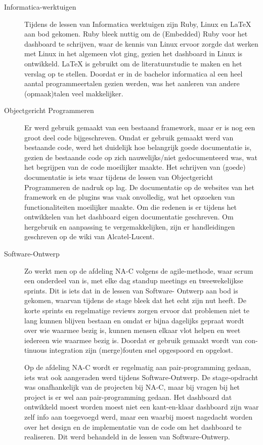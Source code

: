 \documentclass[10pt,a4paper]{article}
\begin{document}
\begin{description}
\item[Informatica-werktuigen]
Tijdens de lessen van Informatica werktuigen zijn Ruby, Linux en LaTeX aan
bod gekomen. Ruby bleek nuttig om de (Embedded) Ruby voor het dashboard
te schrijven, waar de kennis van Linux ervoor zorgde dat werken met Linux in
het algemeen vlot ging, gezien het dashboard in Linux is ontwikkeld. LaTeX is
gebruikt om de literatuurstudie te maken en het verslag op te stellen.
Doordat er in de bachelor informatica al een heel aantal programmeertalen
gezien werden, was het aanleren van andere (opmaak)talen veel makkelijker.

\item[Objectgericht Programmeren]
Er werd gebruik gemaakt van een bestaand framework, maar er is nog een groot
deel code bijgeschreven. Omdat er gebruik gemaakt werd van bestaande code,
werd het duidelijk hoe belangrijk goede documentatie is, gezien de bestaande
code op zich nauwelijks/niet gedocumenteerd was, wat het begrijpen van de
code moeilijker maakte. Het schrijven van (goede) documentatie is iets waar
tijdens de lessen van Objectgericht Programmeren de nadruk op lag. De documentatie
op de websites van het framework en de plugins was vaak onvolledig,
wat het opzoeken van functionaliteiten moeilijker maakte. Om die redenen is er
tijdens het ontwikkelen van het dashboard eigen documentatie geschreven. Om
hergebruik en aanpassing te vergemakkelijken, zijn er handleidingen geschreven
op de wiki van Alcatel-Lucent.

\item[Software-Ontwerp]
Zo werkt men op de afdeling NA-C volgens
de agile-methode, waar scrum een onderdeel van is, met elke dag standup
meetings en tweewekelijkse sprints. Dit is iets dat in de lessen van Software-
Ontwerp aan bod is gekomen, waarvan tijdens de stage bleek dat het echt zijn
nut heeft. De korte sprints en regelmatige reviews zorgen ervoor dat problemen
niet te lang kunnen blijven bestaan en omdat er bijna dagelijks gepraat
wordt over wie waarmee bezig is, kunnen mensen elkaar vlot helpen en weet
iedereen wie waarmee bezig is. Doordat er gebruik gemaakt wordt van con-
tinuous integration zijn (merge)fouten snel opgespoord en opgelost.

Op de afdeling NA-C wordt er
regelmatig aan pair-programming gedaan, iets wat ook aangeraden werd tijdens
Software-Ontwerp. De stage-opdracht was onafhankelijk van de projecten bij
NA-C, maar bij vragen bij het project is er wel aan pair-programming gedaan.
Het dashboard dat ontwikkeld moest worden moest niet een kant-en-klaar dashboard
zijn waar zelf info aan toegevoegd werd, maar een waarbij moest nagedacht
worden over het design en de implementatie van de code om het dashboard te
realiseren. Dit werd behandeld in de lessen van Software-Ontwerp.


\end{description}
\end{document}
